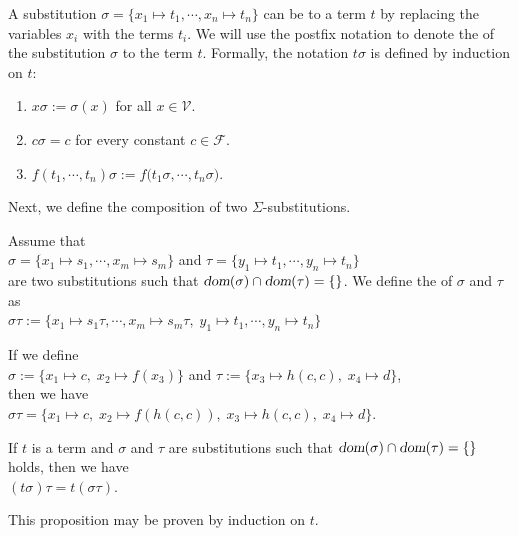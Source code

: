 A substitution $\sigma = \{ x_1 \mapsto t_1, \cdots, x_n \mapsto t_n \}$ can be  to a term $t$
by replacing the variables $x_i$ with the terms $t_i$.  We will use the postfix notation  to denote the
 of the substitution $\sigma$ to the term $t$.  Formally, the notation $t \sigma$ is defined
by induction on $t$:
\begin{enumerate}
\item $x \sigma := \sigma(x)$ \quad for all $x \in \mathcal{V}$.
\item $c \sigma = c$ \quad for every constant $c \in \mathcal{F}$.
\item $f(t_1, \cdots, t_n) \sigma := f\bigl(t_1\sigma, \cdots, t_n\sigma\bigr)$.
\end{enumerate}

\noindent
Next, we define the composition of two $\Sigma$-substitutions.

\begin{Definition} 
    Assume that \\[0.2cm]
    \hspace*{1.3cm}
    $\sigma = \{ x_1 \mapsto s_1, \cdots, x_m \mapsto s_m \}$
    \quad and \quad
    $\tau = \{ y_1 \mapsto t_1, \cdots, y_n \mapsto t_n \}$
    \\[0.2cm]
    are two substitutions such that $\textsl{dom}(\sigma) \cap \textsl{dom}(\tau) = \{\}$.
    We define the    of $\sigma$ and $\tau$  as
    \\[0.2cm]
    \hspace*{1.3cm}
    $\sigma\tau := \{ x_1 \mapsto s_1\tau, \cdots, x_m \mapsto s_m\tau,\; y_1 \mapsto t_1, \cdots, y_n \mapsto t_n \}$
    \eox
\end{Definition}

\exampleEng
If we define
\\[0.2cm]
\hspace*{1.3cm}
$\sigma := \{ x_1 \mapsto c,\; x_2 \mapsto f(x_3) \}$ \quad and \quad
$\tau := \{ x_3 \mapsto h(c,c),\; x_4 \mapsto d \}$,
\\[0.2cm]
then we have
\\[0.2cm]
\hspace*{1.3cm}
$\sigma\tau = \{ x_1 \mapsto c,\; x_2 \mapsto f(h(c,c)),\; x_3 \mapsto h(c,c),\;x_4 \mapsto d \}$.
\eox
\vspace{0.3cm}

\begin{Proposition} \label{satz:composition}
    If $t$ is a term and $\sigma$ and $\tau$ are substitutions such that  
    $\textsl{dom}(\sigma) \cap \textsl{dom}(\tau) = \{\}$ holds, then we have
    \\[0.2cm]
    \hspace*{1.3cm} $(t \sigma)\tau = t (\sigma\tau)$.
    \eox
\end{Proposition}
This proposition may be proven by induction on $t$.

